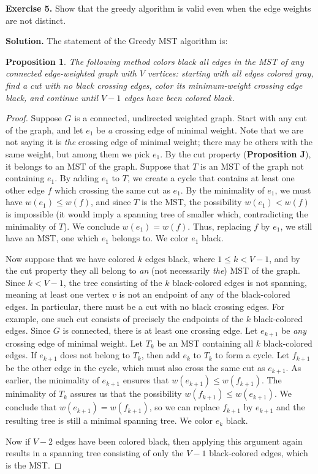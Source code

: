 \documentclass[12pt, a4paper]{article}
\newtheorem*{proposition}{Proposition}
\newenvironment{ex}[2][Exercise]
{\par\medskip\noindent \textbf{#1 #2.}}
{\medskip}
\newenvironment{sol}[1][Solution]
{\par\medskip\noindent \textbf{#1.} }
{\medskip}
\begin{document}
	\begin{ex}{5}
		Show that the greedy algorithm is valid even when the edge weights are not distinct.
	\end{ex}
	\begin{sol}
		The statement of the Greedy MST algorithm is:
		\begin{proposition}
			The following method colors black all edges in the MST of any connected
			edge-weighted graph with $V$ vertices: starting with all edges colored gray,
			find a cut with no black crossing edges, color its minimum-weight crossing edge black,
			and continue until $V-1$ edges have been colored black.
		\end{proposition}
		\begin{proof}
			Suppose $G$ is a connected, undirected weighted graph. Start with any cut of
			the graph, and let $e_1$ be \emph{a} crossing edge of minimal weight. Note
			that we are not saying it is \emph{the} crossing edge of minimal weight;
			there may be others with the same weight, but among them we pick $e_1$.
			By the cut property (\textbf{Proposition J}), it belongs to an MST of the graph.
			Suppose that $T$ is an MST of the graph not containing $e_1$.
			By adding $e_1$ to $T$, we create a cycle that contains at least one other edge
			$f$ which crossing the same cut as $e_1$. By the
			minimality of $e_1$, we must have $w(e_1)\leq w(f)$, and since $T$
			is the MST, the possibility $w(e_1)<w(f)$ is impossible (it would imply
			a spanning tree of smaller which, contradicting the minimality of $T$).
			We conclude $w(e_1)=w(f)$. Thus, replacing $f$ by $e_1$, we still have an MST,
			one which $e_1$ belongs to. We color $e_1$ black.
			
			Now suppose that we have colored $k$ edges black, where $1\leq k<V-1$,
			and by the cut property they all belong to \emph{an} (not necessarily
			\emph{the}) MST of the graph. Since $k<V-1$, the tree consisting of the
			$k$ black-colored edges is not spanning, meaning at least one vertex $v$
			is not an endpoint of any of the black-colored edges. In particular, there
			must be a cut with no black crossing edges. For example, one such cut
			consists of precisely the endpoints of the $k$ black-colored edges.
			Since $G$ is connected, there is at least one crossing edge. Let
			$e_{k+1}$ be \emph{any} crossing edge of minimal weight. Let $T_k$ be an
			MST containing all $k$ black-colored edges. If $e_{k+1}$ does not belong
			to $T_k$, then add $e_k$ to $T_k$ to form a cycle. Let $f_{k+1}$ be the other
			edge in the cycle, which must also cross the same cut as $e_{k+1}$. As
			earlier, the minimality of $e_{k+1}$ ensures that $w(e_{k+1})\leq w(f_{k+1})$.
			The minimality of $T_k$ assures us that the possibility $w(f_{k+1})\leq w(e_{k+1})$.
			We conclude that $w(e_{k+1})=w(f_{k+1})$, so we can replace $f_{k+1}$ by
			$e_{k+1}$ and the resulting tree is still a minimal spanning tree. We color
			$e_k$ black.
			
			Now if $V-2$ edges have been colored black, then applying this argument
			again results in a spanning tree consisting of only the $V-1$ black-colored
			edges, which is the MST.
		\end{proof}
	\end{sol}
\end{document}
